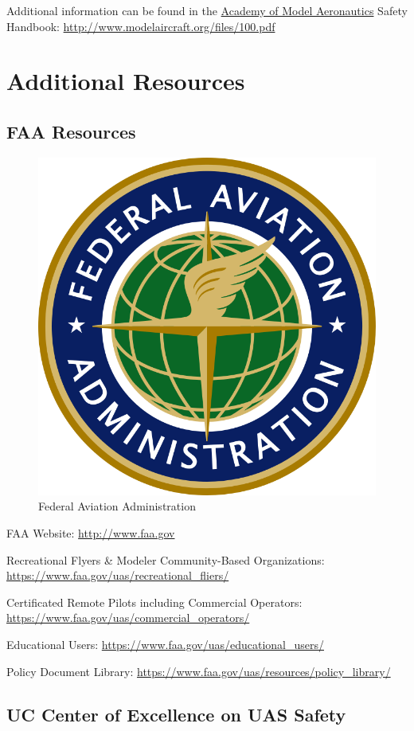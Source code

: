 \documentclass[
]{book}
\begin{document}
Additional information can be found in the \protect\hyperlink{AMA}{Academy of Model Aeronautics} Safety Handbook: \url{http://www.modelaircraft.org/files/100.pdf}

\hypertarget{ch-resources}{%
\chapter{Additional Resources}\label{ch-resources}}

\hypertarget{faa-resources}{%
\section{FAA Resources}\label{faa-resources}}

\begin{figure}

{\centering \includegraphics[width=0.6\linewidth]{images/FAA_logo} 

}

\caption{Federal Aviation Administration}\label{fig:faa-logo}
\end{figure}

FAA Website: \url{http://www.faa.gov}

Recreational Flyers \& Modeler Community-Based Organizations: \url{https://www.faa.gov/uas/recreational_fliers/}

Certificated Remote Pilots including Commercial Operators: \url{https://www.faa.gov/uas/commercial_operators/}

Educational Users: \url{https://www.faa.gov/uas/educational_users/}

Policy Document Library: \url{https://www.faa.gov/uas/resources/policy_library/}

\hypertarget{uc-center-of-excellence-on-uas-safety}{%
\section{UC Center of Excellence on UAS Safety}\label{uc-center-of-excellence-on-uas-safety}}
\end{document}
